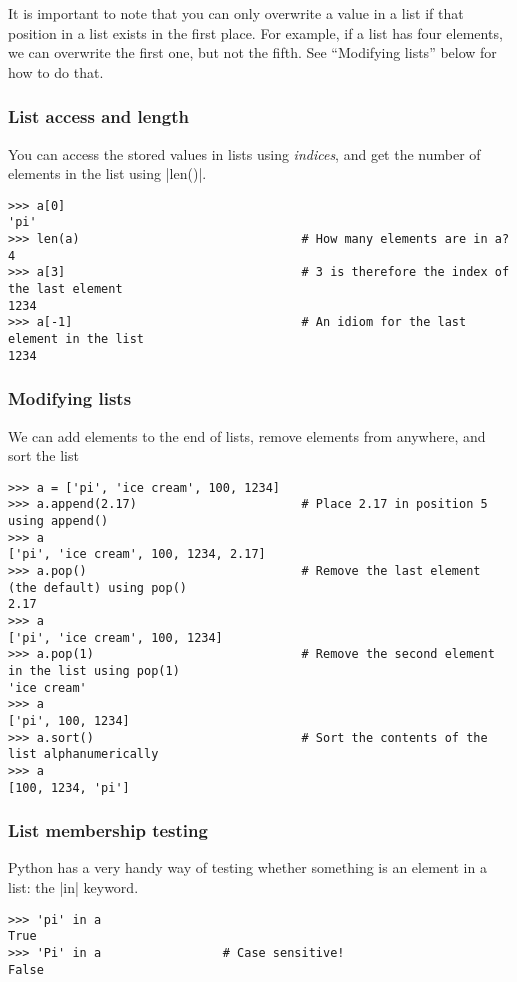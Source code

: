 \documentclass{article}
\begin{document}
It is important to note that you can only overwrite a value in a list if that position in a list exists in the first place.  For example,
if a list has four elements, we can overwrite the first one, but not the fifth.  See ``Modifying lists'' below for how to do that.

\subsubsection*{List access and length}
You can access the stored values in lists using \textit{indices}, and get the number of elements in the list using |len()|.

\begin{Verbatim}
>>> a[0]
'pi'
>>> len(a)                               # How many elements are in a?
4
>>> a[3]                                 # 3 is therefore the index of the last element
1234
>>> a[-1]                                # An idiom for the last element in the list
1234
\end{Verbatim}
\pagebreak

\subsubsection*{Modifying lists}
We can add elements to the end of lists, remove elements from anywhere, and sort the list
\begin{Verbatim}[samepage=true]
>>> a = ['pi', 'ice cream', 100, 1234]
>>> a.append(2.17)                       # Place 2.17 in position 5 using append()
>>> a
['pi', 'ice cream', 100, 1234, 2.17]
>>> a.pop()                              # Remove the last element (the default) using pop()
2.17
>>> a
['pi', 'ice cream', 100, 1234]
>>> a.pop(1)                             # Remove the second element in the list using pop(1)
'ice cream'
>>> a
['pi', 100, 1234]
>>> a.sort()                             # Sort the contents of the list alphanumerically
>>> a
[100, 1234, 'pi']
\end{Verbatim}

\subsubsection*{List membership testing}
Python has a very handy way of testing whether something is an element in a
list: the |in| keyword.

\begin{Verbatim}
>>> 'pi' in a
True
>>> 'Pi' in a                 # Case sensitive!
False
\end{Verbatim}
\end{document}
